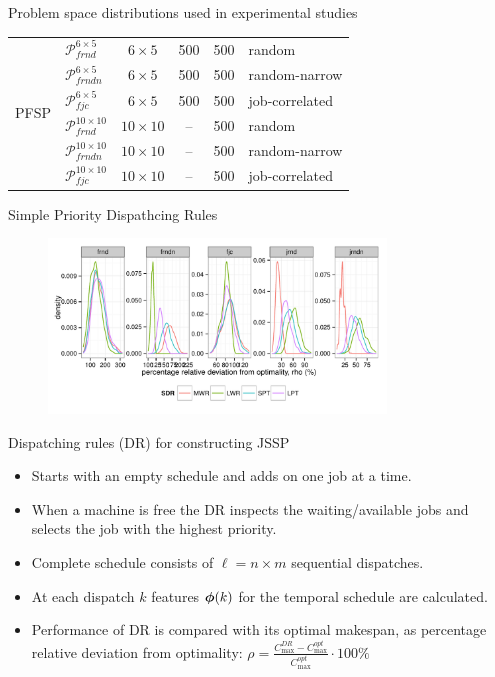 \documentclass[xcolor=pdftex,t,11pt,handout]{beamer}
\begin{document}
{\begin{block}{Problem space distributions used in experimental studies}
\begin{table}
{\begin{tabular}{|l|l|c|c|c|l|}
\multirow{6}{*}{PFSP}
&$\mathcal{P}_{frnd}^{6\times5}$ &$6\times5$& 500&500& random \\ 
&$\mathcal{P}_{frndn}^{6\times5}$&$6\times5$& 500&500& random-narrow \\ 
&$\mathcal{P}_{fjc}^{6\times5}$  &$6\times5$& 500&500& job-correlated \\ 
&$\mathcal{P}_{frnd}^{10\times10}$ &$10\times10$&--&500&random \\ 
&$\mathcal{P}_{frndn}^{10\times10}$&$10\times10$&--&500& random-narrow \\ 
&$\mathcal{P}_{fjc}^{10\times10}$  &$10\times10$&--&500& job-correlated \\ 
\hline
\end{tabular}
}
\end{table}

\end{block}

\framebreak
\begin{block}{Simple Priority Dispathcing Rules}
\begin{figure} \centering
\includegraphics[width=0.8\textwidth]{figures/SDR10x10color}
\end{figure}
\end{block}



\begin{block}{Dispatching rules (DR) for constructing JSSP}
\begin{itemize}
	\item Starts with an empty schedule and adds on one job at a time. 
	\item When a machine is free the DR inspects the waiting/available jobs and selects the job with the \alert{highest priority}. 
	\item Complete schedule consists of $\ell=n\times m$ sequential dispatches.
	\item At each dispatch $k$ features ${\boldsymbol{\phi}}(k)$ for the temporal schedule are calculated.
	\item Performance of DR is compared with its optimal makespan, as percentage relative deviation from optimality: $\rho=\frac{C_{\max}^{DR}-C_{\max}^{opt}}{C_{\max}^{opt}}\cdot 100\%$
\end{itemize}
\end{block}

}
\end{document}
